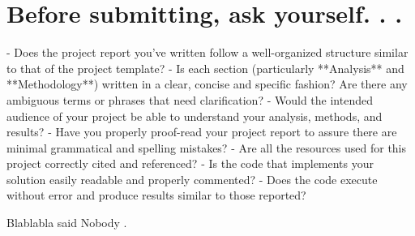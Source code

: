 \documentclass[12pt]{article}
\begin{document}
\section{Before submitting, ask yourself. . .}

- Does the project report you’ve written follow a well-organized structure similar to that of the project template?
- Is each section (particularly **Analysis** and **Methodology**) written in a clear, concise and specific fashion? Are there any ambiguous terms or phrases that need clarification?
- Would the intended audience of your project be able to understand your analysis, methods, and results?
- Have you properly proof-read your project report to assure there are minimal grammatical and spelling mistakes?
- Are all the resources used for this project correctly cited and referenced?
- Is the code that implements your solution easily readable and properly commented?
- Does the code execute without error and produce results similar to those reported?

Blablabla said Nobody .

{}

\end{document}
